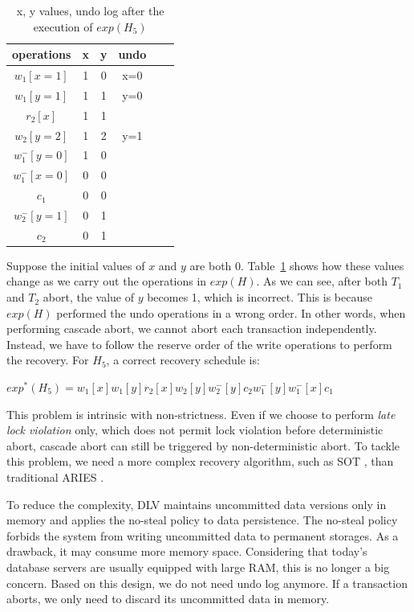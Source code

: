 \documentclass[conference]{IEEEtran}
\begin{document}
\begin{table}[htb]
  \centering
  \begin{tabular}{|c|c|c|c|c|c|}
  \hline
operations & x &  y & undo   \\
  \hline
  \hline
  $w_1[x=1]$ & 1 & 0 & x=0  \\
  \hline
  $w_1[y=1]$ & 1 & 1 & y=0   \\
  \hline
  $r_2[x]$ & 1 & 1 &    \\
  \hline
  $w_2[y=2]$ & 1 & 2 & y=1  \\
  \hline
  $w^-_1[y=0]$ & 1 & 0 &   \\
  \hline
  $w^-_1[x=0]$ & 0 & 0 &   \\
  \hline

  $c_1$ & 0 & 0 &   \\
  \hline
  $w^-_2[y=1]$ & 0 & 1 &    \\
  \hline
  $c_2$ & 0 & 1 &  \\
  \hline
  \end{tabular}
\caption{x, y values, undo log after the execution of ${exp(H_5)}$}
\label{tbl:x_y_vlues}
\end{table}


Suppose the initial values of ${x}$ and ${y}$ are both 0.
Table~\ref{tbl:x_y_vlues} shows how these values change as we carry out the operations in $exp(H)$.
As we can see, after both ${T_1}$ and ${T_2}$ abort, the value of ${y}$ becomes 1, which is incorrect.
This is because $exp(H)$ performed the undo operations in a wrong order.
In other words, when performing cascade abort, we cannot abort each transaction independently.
Instead, we have to follow the reserve order of the write operations to perform the recovery.
For ${H_5}$, a correct recovery schedule is:
\begin{center}
${exp^*(H_5) = w_1[x]w_1[y]r_2[x]w_2[y]w^-_2[y]c_2w^-_1[y]w^-_1[x]c_1}$
\end{center}

This problem is intrinsic with non-strictness.
Even if we choose to perform \emph{late lock violation} only, which does not permit lock violation before deterministic abort,
cascade abort can still be triggered by non-deterministic abort.
To tackle this problem, we need a more complex recovery algorithm, such as SOT \cite{UnifyCR:journals/is/AlonsoVABASW94},
than traditional ARIES \cite{ARIES:journals/tods/MohanHLPS92}.

To reduce the complexity, DLV maintains uncommitted data versions only in memory and applies the no-steal policy to data persistence.
The no-steal policy forbids the system from writing uncommitted data to permanent storages.
As a drawback, it may consume more memory space.
Considering that today's database servers are usually equipped with large RAM, this is no longer a big concern.
Based on this design, we do not need undo log anymore. If a transaction aborts, we only need to discard its uncommitted data in memory.
\end{document}

